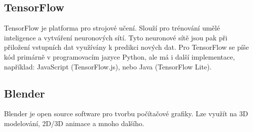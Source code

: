 \subsection{TensorFlow}
TensorFlow je platforma pro strojové učení. Slouží pro trénování umělé inteligence a vytváření neuronových sítí. Tyto neuronové sítě jsou pak při přiložení vstupních dat využívány k predikci nových dat. Pro TensorFlow se píše kód primárně v programovacím jazyce Python, ale má i další implementace, například: JavaScript (TensorFlow.js), nebo Java (TensorFlow Lite).

\subsection{Blender}
Blender je open source software pro tvorbu počítačové grafiky. Lze využít na 3D modelování, 2D/3D animace a mnoho dalšího.



